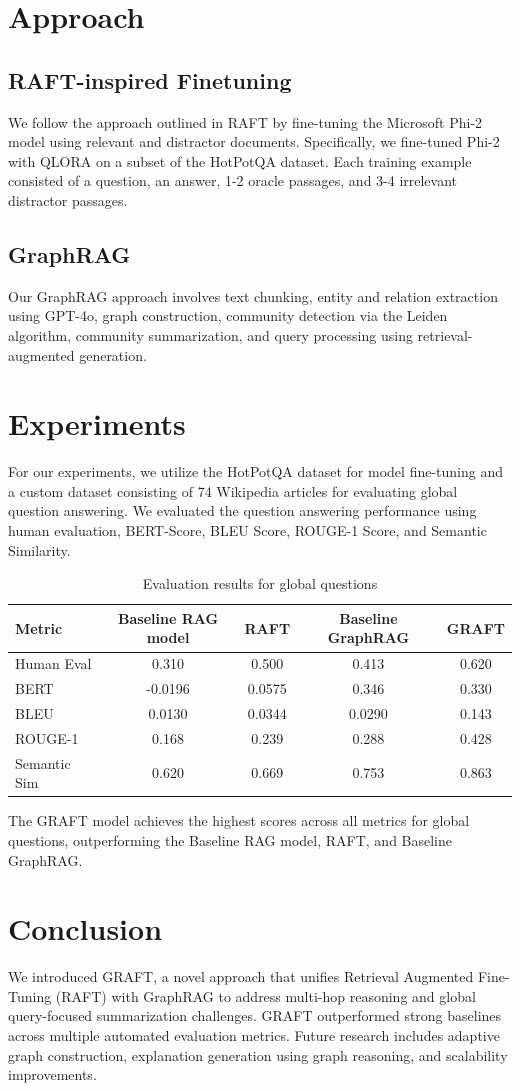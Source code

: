 \documentclass{article}
\begin{document}
\section{Approach}
\subsection{RAFT-inspired Finetuning}
We follow the approach outlined in RAFT by fine-tuning the Microsoft Phi-2 model using relevant and distractor documents. Specifically, we fine-tuned Phi-2 with QLORA on a subset of the HotPotQA dataset. Each training example consisted of a question, an answer, 1-2 oracle passages, and 3-4 irrelevant distractor passages.

\subsection{GraphRAG}
Our GraphRAG approach involves text chunking, entity and relation extraction using GPT-4o, graph construction, community detection via the Leiden algorithm, community summarization, and query processing using retrieval-augmented generation.

\section{Experiments}
For our experiments, we utilize the HotPotQA dataset for model fine-tuning and a custom dataset consisting of 74 Wikipedia articles for evaluating global question answering. We evaluated the question answering performance using human evaluation, BERT-Score, BLEU Score, ROUGE-1 Score, and Semantic Similarity. 

\begin{table}[h]
\centering
\begin{tabular}{lcccc}
\toprule
Metric & Baseline RAG model & RAFT & Baseline GraphRAG & GRAFT \\
\midrule
Human Eval & 0.310 & 0.500 & 0.413 & 0.620 \\
BERT & -0.0196 & 0.0575 & 0.346 & 0.330 \\
BLEU & 0.0130 & 0.0344 & 0.0290 & 0.143 \\
ROUGE-1 & 0.168 & 0.239 & 0.288 & 0.428 \\
Semantic Sim & 0.620 & 0.669 & 0.753 & 0.863 \\
\bottomrule
\end{tabular}
\caption{Evaluation results for global questions}
\end{table}

The GRAFT model achieves the highest scores across all metrics for global questions, outperforming the Baseline RAG model, RAFT, and Baseline GraphRAG. 

\section{Conclusion}
We introduced GRAFT, a novel approach that unifies Retrieval Augmented Fine-Tuning (RAFT) with GraphRAG to address multi-hop reasoning and global query-focused summarization challenges. GRAFT outperformed strong baselines across multiple automated evaluation metrics. Future research includes adaptive graph construction, explanation generation using graph reasoning, and scalability improvements.
\end{document}
